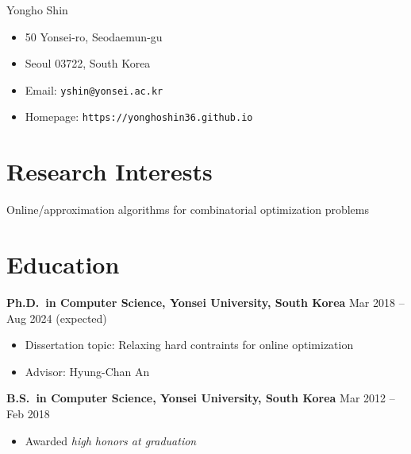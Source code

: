 \documentclass{article}
\newcommand{\killinitspace}{-0.7em}
\begin{document}
{\Huge Yongho Shin}
\begin{itemize}[itemsep=-3pt, leftmargin=2.5pt, label=]
\item 50 Yonsei-ro, Seodaemun-gu
\item Seoul 03722, South Korea
\item Email: \texttt{yshin@yonsei.ac.kr}
\item Homepage: \texttt{https://yonghoshin36.github.io}
\end{itemize}

\section{Research Interests}
Online/approximation algorithms for combinatorial optimization problems

\section{Education}
\textbf{Ph.D.~in Computer Science, Yonsei University, South Korea} \hfill Mar 2018 -- Aug 2024 (expected)
\vspace{\killinitspace}
\begin{itemize}
\item Dissertation topic: Relaxing hard contraints for online optimization
\item Advisor: Hyung-Chan An
\end{itemize}

\textbf{B.S.~in Computer Science, Yonsei University, South Korea} \hfill Mar 2012 -- Feb 2018
\vspace{\killinitspace}
\begin{itemize}
\item Awarded \textsl{high honors at graduation}
\end{itemize}

\end{document}
